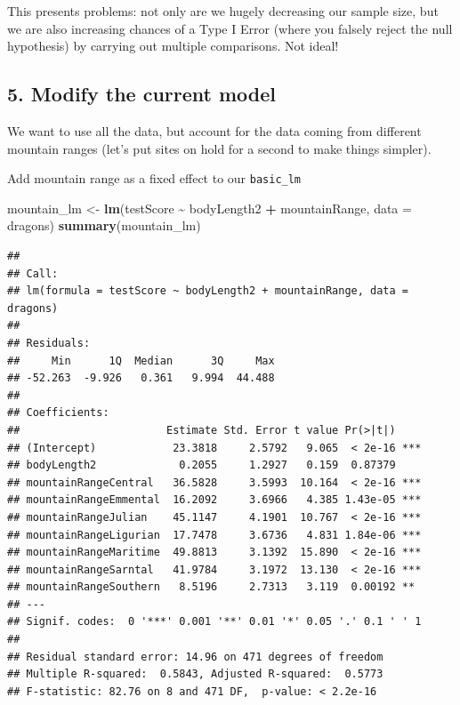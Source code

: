 \documentclass[
]{article}
\newenvironment{Shaded}{\begin{snugshade}}{\end{snugshade}}
\newcommand{\AttributeTok}[1]{\textcolor[rgb]{0.13,0.29,0.53}{#1}}
\newcommand{\FunctionTok}[1]{\textcolor[rgb]{0.13,0.29,0.53}{\textbf{#1}}}
\newcommand{\NormalTok}[1]{#1}
\newcommand{\OtherTok}[1]{\textcolor[rgb]{0.56,0.35,0.01}{#1}}
\newcommand{\SpecialCharTok}[1]{\textcolor[rgb]{0.81,0.36,0.00}{\textbf{#1}}}
\begin{document}
This presents problems: not only are we hugely decreasing our sample
size, but we are also increasing chances of a Type I Error (where you
falsely reject the null hypothesis) by carrying out multiple
comparisons. Not ideal!

\subsection{5. Modify the current model}\label{modify-the-current-model}

We want to use all the data, but account for the data coming from
different mountain ranges (let's put sites on hold for a second to make
things simpler).

Add mountain range as a fixed effect to our \texttt{basic\_lm}

\begin{Shaded}
\begin{Highlighting}[]
\NormalTok{mountain\_lm }\OtherTok{\textless{}{-}} \FunctionTok{lm}\NormalTok{(testScore }\SpecialCharTok{\textasciitilde{}}\NormalTok{ bodyLength2 }\SpecialCharTok{+}\NormalTok{ mountainRange, }\AttributeTok{data =}\NormalTok{ dragons)}
\FunctionTok{summary}\NormalTok{(mountain\_lm)}
\end{Highlighting}
\end{Shaded}

\begin{verbatim}
## 
## Call:
## lm(formula = testScore ~ bodyLength2 + mountainRange, data = dragons)
## 
## Residuals:
##     Min      1Q  Median      3Q     Max 
## -52.263  -9.926   0.361   9.994  44.488 
## 
## Coefficients:
##                       Estimate Std. Error t value Pr(>|t|)    
## (Intercept)            23.3818     2.5792   9.065  < 2e-16 ***
## bodyLength2             0.2055     1.2927   0.159  0.87379    
## mountainRangeCentral   36.5828     3.5993  10.164  < 2e-16 ***
## mountainRangeEmmental  16.2092     3.6966   4.385 1.43e-05 ***
## mountainRangeJulian    45.1147     4.1901  10.767  < 2e-16 ***
## mountainRangeLigurian  17.7478     3.6736   4.831 1.84e-06 ***
## mountainRangeMaritime  49.8813     3.1392  15.890  < 2e-16 ***
## mountainRangeSarntal   41.9784     3.1972  13.130  < 2e-16 ***
## mountainRangeSouthern   8.5196     2.7313   3.119  0.00192 ** 
## ---
## Signif. codes:  0 '***' 0.001 '**' 0.01 '*' 0.05 '.' 0.1 ' ' 1
## 
## Residual standard error: 14.96 on 471 degrees of freedom
## Multiple R-squared:  0.5843, Adjusted R-squared:  0.5773 
## F-statistic: 82.76 on 8 and 471 DF,  p-value: < 2.2e-16
\end{verbatim}
\end{document}
